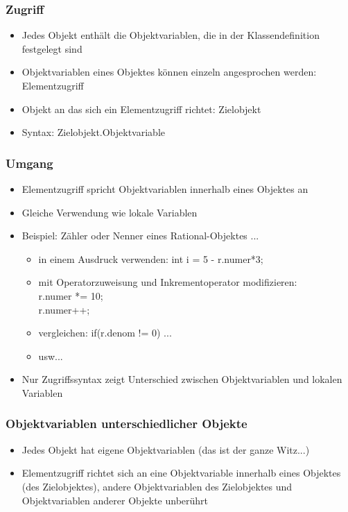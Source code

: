 \subsubsection{Zugriff}
\begin{itemize}
\item Jedes Objekt enthält die Objektvariablen, die in der Klassendefinition festgelegt sind
\item Objektvariablen eines Objektes können einzeln angesprochen werden: Elementzugriff
\item Objekt an das sich ein Elementzugriff richtet: Zielobjekt
\item Syntax: Zielobjekt.Objektvariable
\end{itemize}
\subsubsection{Umgang}
\begin{itemize}
\item Elementzugriff spricht Objektvariablen innerhalb eines Objektes an
\item Gleiche Verwendung wie lokale Variablen
\item Beispiel: Zähler oder Nenner eines Rational-Objektes ...
\begin{itemize}
\item  in einem Ausdruck verwenden:	int i = 5 - r.numer*3;
\item mit Operatorzuweisung und Inkrementoperator modifizieren:\\
r.numer *= 10;\\
r.numer++;
\item vergleichen: if(r.denom != 0) ...
\item usw...
\end{itemize}
\item Nur Zugriffssyntax zeigt Unterschied zwischen Objektvariablen und
lokalen Variablen
\end{itemize}
\subsubsection{Objektvariablen unterschiedlicher Objekte}
\begin{itemize}
\item Jedes Objekt hat eigene Objektvariablen (das ist der ganze Witz...)
\item Elementzugriff richtet sich an eine Objektvariable innerhalb eines Objektes (des Zielobjektes), andere Objektvariablen des Zielobjektes und Objektvariablen anderer Objekte unberührt
\end{itemize}


